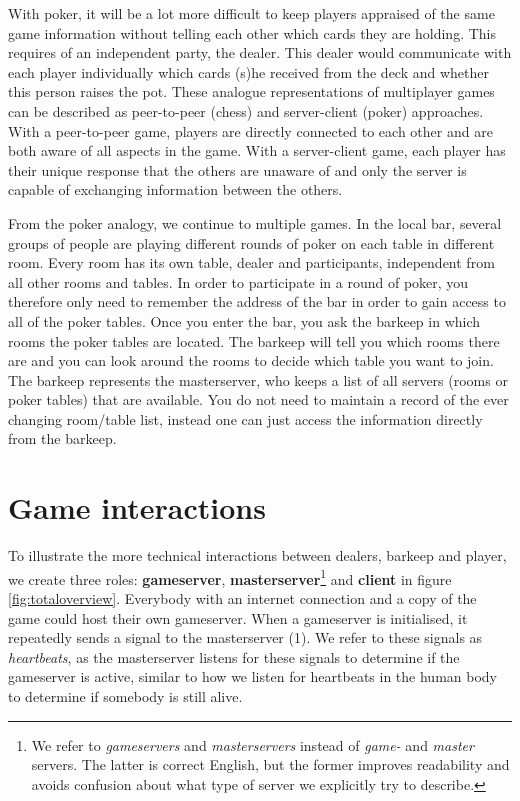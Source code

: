 With poker, it will be a lot more difficult to keep players appraised of the same game information without telling each other which cards they are holding. This requires of an independent party, the dealer. This dealer would communicate with each player individually which cards (s)he received from the deck and whether this person raises the pot. These analogue representations of multiplayer games can be described as peer-to-peer (chess) and server-client (poker) approaches. With a peer-to-peer game, players are directly connected to each other and are both aware of all aspects in the game. With a server-client game, each player has their unique response that the others are unaware of and only the server is capable of exchanging information between the others. 

From the poker analogy, we continue to multiple games. In the local bar, several groups of people are playing different rounds of poker on each table in different room. Every room has its own table, dealer and participants, independent from all other rooms and tables. In order to participate in a round of poker, you therefore only need to remember the address of the bar in order to gain access to all of the poker tables. Once you enter the bar, you ask the barkeep in which rooms the poker tables are located. The barkeep will tell you which rooms there are and you can look around the rooms to decide which table you want to join. The barkeep represents the masterserver, who keeps a list of all servers (rooms or poker tables) that are available. You do not need to maintain a record of the ever changing room/table list, instead one can just access the information directly from the barkeep.

\section{Game interactions}
To illustrate the more technical interactions between dealers, barkeep and player, we create three roles: {\bf gameserver}, {\bf masterserver}\footnote{We refer to \emph{gameservers} and \emph{masterservers} instead of \emph{game-} and \emph{master} servers. The latter is correct English, but the former improves readability and avoids confusion about what type of server we explicitly try to describe.} and {\bf client} in figure \ref{fig:totaloverview}. Everybody with an internet connection and a copy of the game could host their own gameserver. When a gameserver is initialised, it repeatedly sends a signal to the masterserver (1). We refer to these signals as \emph{heartbeats}, as the masterserver listens for these signals to determine if the gameserver is active, similar to how we listen for heartbeats in the human body to determine if somebody is still alive. 

